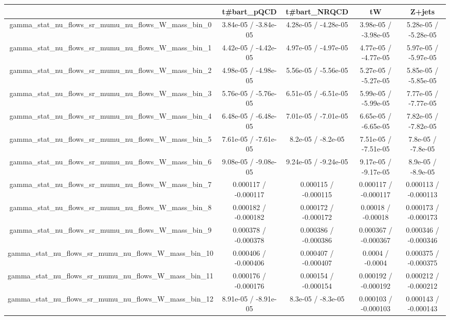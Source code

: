 \documentclass[10pt]{article}
\begin{document}
\begin{table}[htbp]
\begin{center}
\begin{tabular}{|c|c|c|c|c|}
\hline 
      & t#bar{t}_{pQCD}      & t#bar{t}_{NRQCD}      & tW      & Z+jets \\ 
\hline 
  gamma_stat_nu_flows_sr_mumu_nu_flows_W_mass_bin_0 & 3.84e-05 / -3.84e-05 & 4.28e-05 / -4.28e-05 & 3.98e-05 / -3.98e-05 & 5.28e-05 / -5.28e-05 \\ 
  gamma_stat_nu_flows_sr_mumu_nu_flows_W_mass_bin_1 & 4.42e-05 / -4.42e-05 & 4.97e-05 / -4.97e-05 & 4.77e-05 / -4.77e-05 & 5.97e-05 / -5.97e-05 \\ 
  gamma_stat_nu_flows_sr_mumu_nu_flows_W_mass_bin_2 & 4.98e-05 / -4.98e-05 & 5.56e-05 / -5.56e-05 & 5.27e-05 / -5.27e-05 & 5.85e-05 / -5.85e-05 \\ 
  gamma_stat_nu_flows_sr_mumu_nu_flows_W_mass_bin_3 & 5.76e-05 / -5.76e-05 & 6.51e-05 / -6.51e-05 & 5.99e-05 / -5.99e-05 & 7.77e-05 / -7.77e-05 \\ 
  gamma_stat_nu_flows_sr_mumu_nu_flows_W_mass_bin_4 & 6.48e-05 / -6.48e-05 & 7.01e-05 / -7.01e-05 & 6.65e-05 / -6.65e-05 & 7.82e-05 / -7.82e-05 \\ 
  gamma_stat_nu_flows_sr_mumu_nu_flows_W_mass_bin_5 & 7.61e-05 / -7.61e-05 & 8.2e-05 / -8.2e-05 & 7.51e-05 / -7.51e-05 & 7.8e-05 / -7.8e-05 \\ 
  gamma_stat_nu_flows_sr_mumu_nu_flows_W_mass_bin_6 & 9.08e-05 / -9.08e-05 & 9.24e-05 / -9.24e-05 & 9.17e-05 / -9.17e-05 & 8.9e-05 / -8.9e-05 \\ 
  gamma_stat_nu_flows_sr_mumu_nu_flows_W_mass_bin_7 & 0.000117 / -0.000117 & 0.000115 / -0.000115 & 0.000117 / -0.000117 & 0.000113 / -0.000113 \\ 
  gamma_stat_nu_flows_sr_mumu_nu_flows_W_mass_bin_8 & 0.000182 / -0.000182 & 0.000172 / -0.000172 & 0.00018 / -0.00018 & 0.000173 / -0.000173 \\ 
  gamma_stat_nu_flows_sr_mumu_nu_flows_W_mass_bin_9 & 0.000378 / -0.000378 & 0.000386 / -0.000386 & 0.000367 / -0.000367 & 0.000346 / -0.000346 \\ 
  gamma_stat_nu_flows_sr_mumu_nu_flows_W_mass_bin_10 & 0.000406 / -0.000406 & 0.000407 / -0.000407 & 0.0004 / -0.0004 & 0.000375 / -0.000375 \\ 
  gamma_stat_nu_flows_sr_mumu_nu_flows_W_mass_bin_11 & 0.000176 / -0.000176 & 0.000154 / -0.000154 & 0.000192 / -0.000192 & 0.000212 / -0.000212 \\ 
  gamma_stat_nu_flows_sr_mumu_nu_flows_W_mass_bin_12 & 8.91e-05 / -8.91e-05 & 8.3e-05 / -8.3e-05 & 0.000103 / -0.000103 & 0.000143 / -0.000143 \\ 

\end{tabular}
\end{center}
\end{table}
\end{document}
